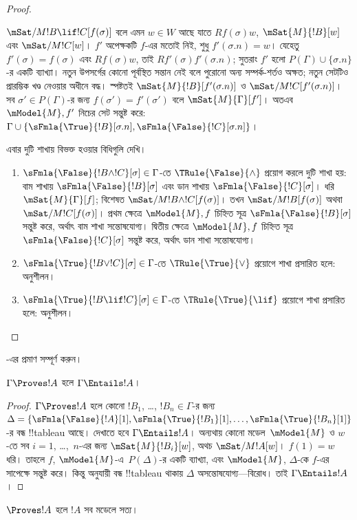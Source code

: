 \documentclass[../../../include/open-logic-section]{subfiles}
\begin{document}
\begin{proof}
\begin{enumerate}
  $\mSat/{M}{!B \lif !C}[f(\sigma)]$ বলে এমন
  $w \in W$ আছে যাতে $Rf(\sigma)w$,
  $\mSat{M}{!B}[w]$ এবং $\mSat/{M}{!C}[w]$।
  $f'$ অপেক্ষকটি $f$-এর মতোই নিই, শুধু
  $f'(\sigma.n) = w$। যেহেতু
  $f'(\sigma) = f(\sigma)$ এবং $Rf(\sigma)w$, তাই
  $Rf'(\sigma)f'(\sigma.n)$; সুতরাং $f'$ হলো
  $P(\Gamma) \cup \{\sigma.n\}$-র একটি ব্যাখ্যা। নতুন উপসর্গের
  কোনো পূর্বস্থিত সন্তান নেই বলে পুরোনো অন্য সম্পর্ক-শর্তও
  অক্ষত; নতুন সেটটিও প্রারম্ভিক খণ্ড নেওয়ার অধীনে বদ্ধ। স্পষ্টতই
  $\mSat{M}{!B}[f'(\sigma.n)]$ ও
  $\mSat/{M}{!C}[f'(\sigma.n)]$। সব
  $\sigma' \in P(\Gamma)$-র জন্য
  $f(\sigma') = f'(\sigma')$ বলে $\mSat{M}{\Gamma}[f']$।
  অতএব $\mModel{M}, f'$ নিচের সেট সন্তুষ্ট করে:
  $\Gamma \cup \{\sFmla{\True}{!B}[\sigma.n],
  \sFmla{\False}{!C}[\sigma.n]\}$।
\end{enumerate}
এবার দুটি শাখায় বিভক্ত হওয়ার বিধিগুলি দেখি।
\begin{enumerate}
\item $\sFmla{\False}{!B \land !C}[\sigma] \in \Gamma$-তে
  $\TRule{\False}{\land}$ প্রয়োগ করলে দুটি শাখা হয়:
  বাম শাখায় $\sFmla{\False}{!B}[\sigma]$ এবং ডান শাখায়
  $\sFmla{\False}{!C}[\sigma]$। ধরি
  $\mSat{M}{\Gamma}[f]$; বিশেষত
  $\mSat/{M}{!B \land !C}[f(\sigma)]$। তখন
  $\mSat/{M}{!B}[f(\sigma)]$ অথবা
  $\mSat/{M}{!C}[f(\sigma)]$। প্রথম ক্ষেত্রে
  $\mModel{M}, f$ চিহ্নিত সূত্র
  $\sFmla{\False}{!B}[\sigma]$ সন্তুষ্ট করে, অর্থাৎ
  বাম শাখা সন্তোষযোগ্য। দ্বিতীয় ক্ষেত্রে
  $\mModel{M}, f$ চিহ্নিত সূত্র
  $\sFmla{\False}{!C}[\sigma]$ সন্তুষ্ট করে, অর্থাৎ
  ডান শাখা সন্তোষযোগ্য।
\item $\sFmla{\True}{!B \lor !C}[\sigma] \in \Gamma$-তে
  $\TRule{\True}{\lor}$ প্রয়োগে শাখা প্রসারিত হলে:
  অনুশীলন।
\item $\sFmla{\True}{!B \lif !C}[\sigma] \in \Gamma$-তে
  $\TRule{\True}{\lif}$ প্রয়োগে শাখা প্রসারিত হলে:
  অনুশীলন।
\end{enumerate}
\end{proof}

\begin{prob}
-এর প্রমাণ
সম্পূর্ণ করুন।
\end{prob}

\begin{cor}
$\Gamma \Proves !A$ হলে $\Gamma \Entails !A$।
\end{cor}

\begin{proof}
  $\Gamma \Proves !A$ হলে কোনো
  $!B_1$, \dots, $!B_n \in \Gamma$-র জন্য
  $\Delta = \{\sFmla{\False}{!A}[1], \sFmla{\True}{!B_1}[1],
  \dots, \sFmla{\True}{!B_n}[1]\}$-র বন্ধ !!{tableau}
  আছে। দেখাতে হবে $\Gamma \Entails !A$। অন্যথায় কোনো
  মডেল~$\mModel{M}$ ও $w$-তে সব $i=1$, \dots,~$n$-এর
  জন্য $\mSat{M}{!B_i}[w]$, অথচ
  $\mSat/{M}{!A}[w]$। $f(1) = w$ ধরি। তাহলে $f$,
  $\mModel{M}$-এ~$P(\Delta)$-র একটি ব্যাখ্যা, এবং
  $\mModel{M}$, $\Delta$-কে $f$-এর সাপেক্ষে সন্তুষ্ট করে।
  কিন্তু  অনুযায়ী
  বন্ধ !!{tableau} থাকায় $\Delta$ অসন্তোষযোগ্য—বিরোধ।
  তাই $\Gamma \Entails !A$।
\end{proof}

\begin{cor}
$\Proves !A$ হলে $!A$ সব মডেলে সত্য।
\end{cor}
\end{document}
